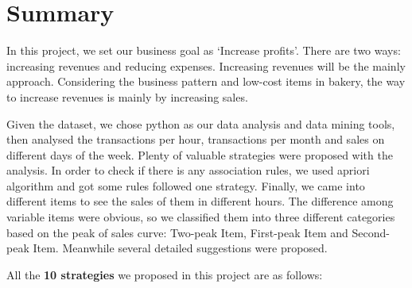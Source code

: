 \documentclass[11pt]{article}
\begin{document}
    \hypertarget{summary}{%
\section{Summary}\label{summary}}

In this project, we set our business goal as `Increase profits'. There
are two ways: increasing revenues and reducing expenses. Increasing
revenues will be the mainly approach. Considering the business pattern
and low-cost items in bakery, the way to increase revenues is mainly by
increasing sales.

Given the dataset, we chose python as our data analysis and data mining
tools, then analysed the transactions per hour, transactions per month
and sales on different days of the week. Plenty of valuable strategies
were proposed with the analysis. In order to check if there is any
association rules, we used apriori algorithm and got some rules followed
one strategy. Finally, we came into different items to see the sales of
them in different hours. The difference among variable items were
obvious, so we classified them into three different categories based on
the peak of sales curve: Two-peak Item, First-peak Item and Second-peak
Item. Meanwhile several detailed suggestions were proposed.

All the \textbf{10 strategies} we proposed in this project are as
follows:
\end{document}
